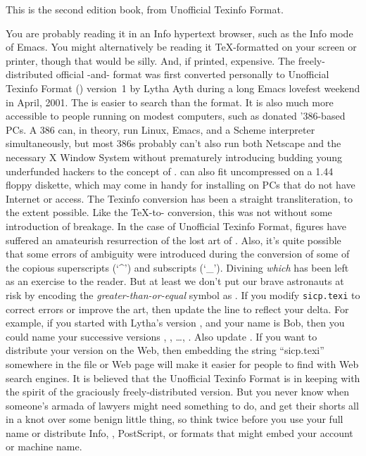 \label{UTF}

This is the second edition  book, from Unofficial Texinfo Format.

You are probably reading it in an Info hypertext browser, such as the Info mode of Emacs.
You might alternatively be reading it \TeX{}-formatted on your screen or printer, though that would be silly.
And, if printed, expensive.
The freely-distributed official -and- format was first converted personally to Unofficial Texinfo Format () version~1 by Lytha Ayth during a long Emacs lovefest weekend in April, 2001.
The  is easier to search than the  format.
It is also much more accessible to people running on modest computers, such as donated '386-based PCs.
A 386 can, in theory, run Linux, Emacs, and a Scheme interpreter simultaneously, but most 386s probably can’t also run both Netscape and the necessary X Window System without prematurely introducing budding young underfunded hackers to the concept of .
 can also fit uncompressed on a 1.44 floppy diskette, which may come in handy for installing  on PCs that do not have Internet or  access.
The Texinfo conversion has been a straight transliteration, to the extent possible.
Like the \TeX{}-to- conversion, this was not without some introduction of breakage.
In the case of Unofficial Texinfo Format, figures have suffered an amateurish resurrection of the lost art of .
Also, it’s quite possible that some errors of ambiguity were introduced during the conversion of some of the copious superscripts (‘\^{}’) and subscripts (‘\_’).
Divining \emph{which} has been left as an exercise to the reader.
But at least we don’t put our brave astronauts at risk by encoding the \emph{greater-than-or-equal} symbol as .
If you modify \texttt{sicp.texi} to correct errors or improve the  art, then update the  line to reflect your delta.
For example, if you started with Lytha’s version , and your name is Bob, then you could name your successive versions , , …, .
Also update .
If you want to distribute your version on the Web, then embedding the string “sicp.texi” somewhere in the file or Web page will make it easier for people to find with Web search engines.
It is believed that the Unofficial Texinfo Format is in keeping with the spirit of the graciously freely-distributed  version.
But you never know when someone’s armada of lawyers might need something to do, and get their shorts all in a knot over some benign little thing, so think twice before you use your full name or distribute Info, , PostScript, or  formats that might embed your account or machine name.

